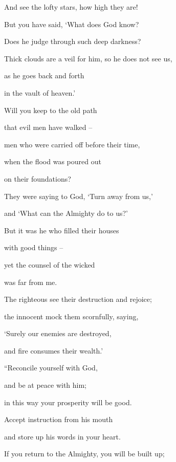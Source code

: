 {\par }{\Q And see
the lofty
stars, how high they are!
\par }{\Q {}But you have said,
‘What
does God
know?
\par }{\Q Does he judge
through
such deep darkness?
\par }{\Q {}Thick clouds
are a veil
for him, so he does not
see
us,

\par }{\Q as he goes back and forth
\par }{\Q in the vault
of heaven.’
\par }{\Q {}Will you keep
to the old
path
\par }{\Q that
evil
men
have
walked –
\par }{\Q {}men who were carried
off before their time,
\par }{\Q when the flood
was poured
out

\par }{\Q on their foundations?
\par }{\Q {}They were saying
to God,
‘Turn
away from us,’
\par }{\Q and ‘What
can the Almighty
do to us?’
\par }{\Q {}But it was he who filled
their houses
\par }{\Q with good things –
\par }{\Q yet the counsel of the wicked
\par }{\Q was far from me.
\par }{\Q {}The righteous
see
their destruction and rejoice;
\par }{\Q the innocent
mock them scornfully, saying,
\par }{\Q {}‘Surely
our enemies
are destroyed,
\par }{\Q and fire
consumes their wealth.’
\par }{\Q {}“Reconcile
yourself with
God,

\par }{\Q and be at peace
with him;
\par }{\Q in this way your prosperity will be good.
\par }{\Q {}Accept
instruction
from his mouth
\par }{\Q and store up
his words
in your heart.
\par }{\Q {}If
you return
to
the Almighty,
you will be built
up;

}
